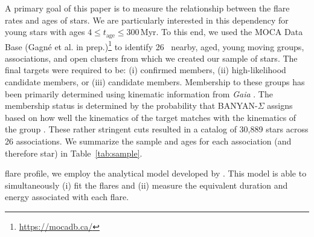 \documentclass[twocolumn, linenumbers]{aastex631}
\begin{document}
A primary goal of this paper is to measure the relationship between the flare rates and ages of stars. We are particularly interested in this dependency for young stars with ages
$4 \leq t_\textrm{age} \leq 300$\,Myr. To this end, we used the MOCA Data Base (Gagné et al. in prep.)\footnote{\url{https://mocadb.ca/}} to identify 26~ nearby, aged, young moving
groups, associations, and open clusters from which we created our sample of stars. The final targets were required to be: (i) confirmed members, (ii) high-likelihood candidate members,
or (iii) candidate members.  Membership to these groups has been primarily determined using kinematic information from \textit{Gaia} \citep{gaia16, gaia18}. The membership status is
determined by the probability that BANYAN-$\Sigma$ assigns based on how well the kinematics of the target matches with the kinematics of the group \citep{gagne18}. These rather
stringent cuts resulted in a catalog of 30,889 stars across 26 associations. We summarize the sample and ages for each association (and therefore star) in Table~\ref{tab:sample}.

flare profile, we employ the analytical model developed by \cite{tovar22}. This model is able to simultaneously (i) fit the flares and  (ii) measure the equivalent duration and energy
associated with each flare.
\end{document}
